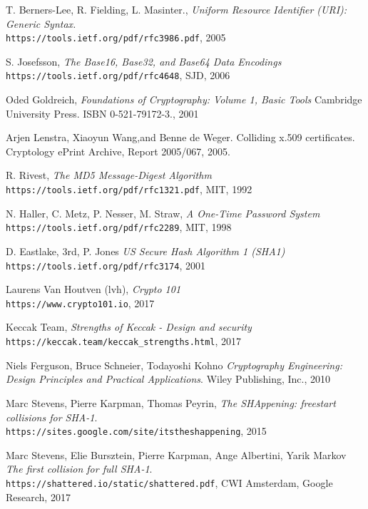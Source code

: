 \begin{thebibliography}{9}

T. Berners-Lee, R. Fielding, L. Masinter.,
\textit{Uniform Resource Identifier (URI): Generic Syntax.} \\ 
\texttt{https://tools.ietf.org/pdf/rfc3986.pdf}, 2005

S. Josefsson,
\textit{The Base16, Base32, and Base64 Data Encodings} \\ 
\texttt{https://tools.ietf.org/pdf/rfc4648}, SJD, 2006

Oded Goldreich,
\textit{Foundations of Cryptography: Volume 1, Basic Tools}  
Cambridge University Press. ISBN 0-521-79172-3., 2001

Arjen Lenstra, Xiaoyun Wang,and Benne de Weger. Colliding
x.509 certificates. Cryptology ePrint Archive, Report 2005/067,
2005.

R. Rivest,
\textit{The MD5 Message-Digest Algorithm} \\ 
\texttt{https://tools.ietf.org/pdf/rfc1321.pdf}, MIT, 1992

N. Haller, C. Metz, P. Nesser, M. Straw, 
\textit{A One-Time Password System} \\ 
\texttt{https://tools.ietf.org/pdf/rfc2289}, MIT, 1998

D. Eastlake, 3rd, P. Jones
\textit{US Secure Hash Algorithm 1 (SHA1)} \\ 
\texttt{https://tools.ietf.org/pdf/rfc3174}, 2001

Laurens Van Houtven (lvh),
\textit{Crypto 101} \\ 
\texttt{https://www.crypto101.io}, 2017

Keccak Team,
\textit{Strengths of Keccak - Design and security} \\ 
\texttt{https://keccak.team/keccak\_strengths.html}, 2017

Niels Ferguson, Bruce Schneier, Todayoshi Kohno
\textit{Cryptography Engineering: Design Principles and Practical Applications}. Wiley Publishing, Inc., 2010

Marc Stevens, Pierre Karpman, Thomas Peyrin,
\textit{The SHAppening: freestart collisions for SHA-1}. \\
\texttt{https://sites.google.com/site/itstheshappening}, 2015

Marc Stevens, Elie Bursztein, Pierre Karpman, Ange Albertini, Yarik Markov
\textit{The first collision for full SHA-1}. \\
\texttt{https://shattered.io/static/shattered.pdf}, CWI Amsterdam, Google Research, 2017


\end{thebibliography}
